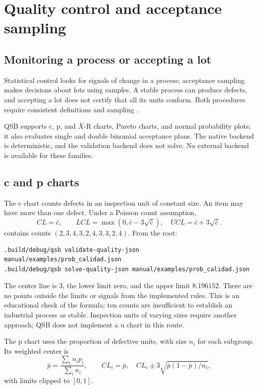 \chapter{Quality control and acceptance sampling}
\label{ch:calidad}

\section{Monitoring a process or accepting a lot}
Statistical control looks for signals of change in a process; acceptance
sampling makes decisions about lots using samples. A stable process can produce
defects, and accepting a lot does not certify that all its units conform.
Both procedures require consistent definitions and sampling
\cite{montgomery2020quality}.

QSB supports c, p, and \(\bar X\)-R charts, Pareto charts, and normal
probability plots; it also evaluates single and double binomial acceptance
plans. The native backend is deterministic, and the validation backend does
not solve. No external backend is available for these families.

\section{c and p charts}
The c chart counts defects in an inspection unit of constant size. An item
may have more than one defect. Under a Poisson count assumption,
\[
 CL=\bar c,\qquad LCL=\max(0,\bar c-3\sqrt{\bar c}),\quad
 UCL=\bar c+3\sqrt{\bar c}.
\]
 contains counts
\((2,3,4,3,2,4,3,3,2,4)\). From the root:
\begin{lstlisting}
.build/debug/qsb validate-quality-json manual/examples/prob_calidad.json
.build/debug/qsb solve-quality-json manual/examples/prob_calidad.json
\end{lstlisting}
The center line is \(3\), the lower limit zero, and the upper limit
\(8.196152\). There are no points outside the limits or signals from the
implemented rules. This is an educational check of the formula; ten counts
are insufficient to establish an industrial process as stable. Inspection
units of varying sizes require another approach; QSB does not implement a u
chart in this route.

The p chart uses the proportion of defective units, with size \(n_i\) for
each subgroup. Its weighted center is
\[
 \bar p=\frac{\sum_i n_ip_i}{\sum_i n_i},\qquad
 CL_i=\bar p,\quad CL_i\pm3\sqrt{\bar p(1-\bar p)/n_i},
\]
with limits clipped to \([0,1]\).

